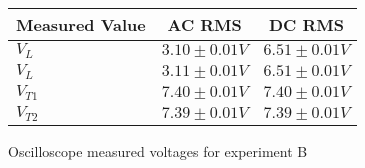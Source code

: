\begin{figure}[H]    \centering    \begin{tabular}{|l|c|c|}
        \hline
        Measured Value & AC RMS & DC RMS \\
        \hline
        $V_{L}$ & $3.10\pm 0.01\unit{V}$ & $6.51\pm 0.01\unit{V}$ \\
        $V_{L}$ & $3.11\pm 0.01\unit{V}$ & $6.51\pm 0.01\unit{V}$ \\
        $V_{T1}$ & $7.40\pm 0.01\unit{V}$ & $7.40\pm 0.01\unit{V}$ \\
        $V_{T2}$ & $7.39\pm 0.01\unit{V}$ & $7.39\pm 0.01\unit{V}$ \\
        \hline
    \end{tabular}    \caption{Oscilloscope measured voltages for experiment B}\end{figure}
